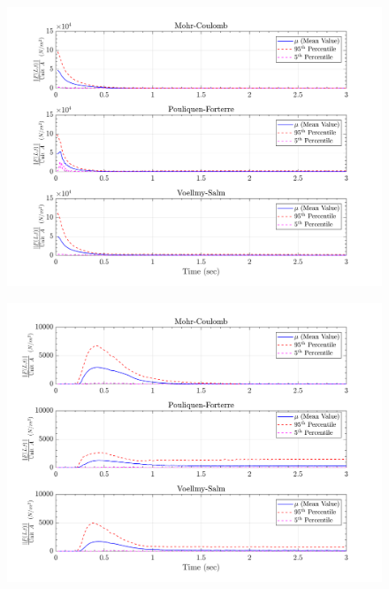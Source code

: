 \documentclass{article}
\begin{document}
\begin{figure}[H]
	\begin{minipage}[b]{0.5\linewidth}
    	\centering
    	\includegraphics[width=1\textwidth]{InclinedPlane/LocalRecords/Records/Ftotal_L1.png}
    	\label{fig:Ramp-L1-Ftot}
	\end{minipage}
	\begin{minipage}[b]{0.5\linewidth}
		\centering
		\includegraphics[width=1\textwidth]{InclinedPlane/LocalRecords/Records/Ftotal_L8.png}
    	\label{fig:Ramp-L2-Ftot}
    \end{minipage}


\end{figure}
\end{document}
